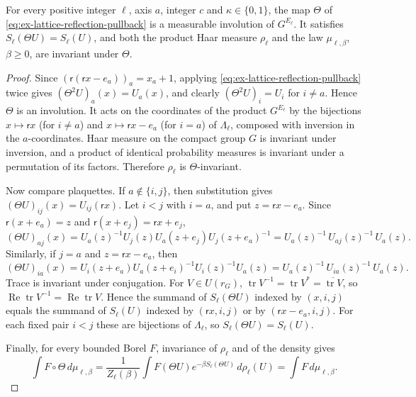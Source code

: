 \begin{proposition}
\label{prop:ex-lattice-reflection-invariance}
For every positive integer $\ell$, axis $a$, integer $c$ and
$\kappa\in\{0,1\}$, the map $\Theta$ of
\eqref{eq:ex-lattice-reflection-pullback} is a measurable involution of
$G^{E_\ell}$. It satisfies $S_\ell(\Theta U)=S_\ell(U)$, and both the product
Haar measure $\rho_\ell$ and the law $\mu_{\ell,\beta}$, $\beta\ge0$, are
invariant under $\Theta$.
\end{proposition}
\begin{proof}
Since $(\mathsf r(\mathsf rx-e_a))_a=x_a+1$, applying
\eqref{eq:ex-lattice-reflection-pullback} twice gives
$(\Theta^2U)_a(x)=U_a(x)$, and clearly $(\Theta^2U)_i=U_i$ for $i\ne a$.
Hence $\Theta$ is an involution. It acts on the coordinates of the product
$G^{E_\ell}$ by the bijections $x\mapsto\mathsf rx$ (for $i\ne a$) and
$x\mapsto\mathsf rx-e_a$ (for $i=a$) of $\Lambda_\ell$, composed with
inversion in the $a$-coordinates. Haar measure on the compact group $G$ is
invariant under inversion, and a product of identical probability measures
is invariant under a permutation of its factors. Therefore $\rho_\ell$ is
$\Theta$-invariant.

Now compare plaquettes. If $a\notin\{i,j\}$, then substitution gives
$(\Theta U)_{ij}(x)=U_{ij}(\mathsf rx)$. Let $i<j$ with $i=a$, and put
$z=\mathsf rx-e_a$. Since $\mathsf r(x+e_a)=z$ and
$\mathsf r(x+e_j)=\mathsf rx+e_j$,
\[
 (\Theta U)_{aj}(x)
  =U_a(z)^{-1}U_j(z)U_a(z+e_j)U_j(z+e_a)^{-1}
  =U_a(z)^{-1}\,U_{aj}(z)^{-1}\,U_a(z).
\]
Similarly, if $j=a$ and $z=\mathsf rx-e_a$, then
\[
 (\Theta U)_{ia}(x)
  =U_i(z+e_a)U_a(z+e_i)^{-1}U_i(z)^{-1}U_a(z)
  =U_a(z)^{-1}\,U_{ia}(z)^{-1}\,U_a(z).
\]
Trace is invariant under conjugation. For $V\in U(r_G)$,
$\operatorname{tr}V^{-1}=\operatorname{tr}V^*=\overline{\operatorname{tr}V}$,
so $\operatorname{Re}\operatorname{tr}V^{-1}=\operatorname{Re}\operatorname{tr}V$.
Hence the summand of $S_\ell(\Theta U)$ indexed by $(x,i,j)$ equals the
summand of $S_\ell(U)$ indexed by $(\mathsf rx,i,j)$ or by
$(\mathsf rx-e_a,i,j)$. For each fixed pair $i<j$ these are bijections of
$\Lambda_\ell$, so $S_\ell(\Theta U)=S_\ell(U)$.

Finally, for every bounded Borel $F$, invariance of $\rho_\ell$ and of the
density gives
\[
 \int F\circ\Theta\,d\mu_{\ell,\beta}
  =\frac1{Z_\ell(\beta)}\int F(\Theta U)e^{-\beta S_\ell(\Theta U)}\,d\rho_\ell(U)
  =\int F\,d\mu_{\ell,\beta}.
\]
\end{proof}

